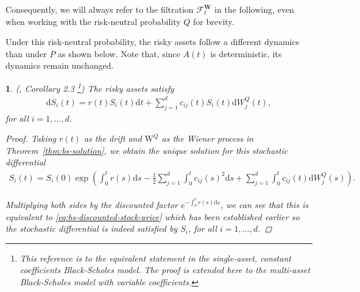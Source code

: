 \documentclass[english]{article}
\numberwithin{equation}{section}
\numberwithin{figure}{section}
\theoremstyle{bolddescit}
\newtheorem{theorem}{\protect\theoremname}[section]
\theoremstyle{definition}
\theoremstyle{definition}
\theoremstyle{plain}
\theoremstyle{plain}
\theoremstyle{bolddesc}
\theoremstyle{plain}
\theoremstyle{remark}
\providecommand{\theoremname}{Theorem}
\begin{document}
Consequently, we will always refer to the filtration $\mathcal{F}^\mathbf{W}_t$ in the following, even when working with the risk-neutral probability $Q$ for brevity.

Under this risk-neutral probability, the risky assets follow a different dynamics than under $P$ as shown below. Note that, since $A(t)$ is deterministic, its dynamics remain unchanged.

\begin{theorem}\label{thm:bs-risk-neutral-dynamics}
  (\cite{capinski_blackscholes_2012}, Corollary 2.3 \footnote{This reference is to the equivalent statement in the single-asset, constant coefficients Black-Scholes model. The proof is extended here to the multi-asset Black-Scholes model with variable coefficients.\label{foot:basic-bs-model}})
  The risky assets satisfy
  \begin{align*}
    \mathrm{d}S_i(t) = r(t) S_i(t) \mathrm{d}t + \sum_{j=1}^{d} c_{ij}(t) S_i(t) \mathrm{d}W^Q_j(t),
  \end{align*}
  for all $i=1,\ldots,d$.

  \begin{proof}
    Taking $r(t)$ as the drift and $\mathrm{W}^Q$ as the Wiener process in Theorem~\ref{thm:bs-solution}, we obtain the unique solution for this stochastic differential
    \begin{align}\label{eq:bs-risk-neutral-dynamics}
      S_i(t)
      = S_i(0) \exp  \left( \int_0^t r(s) \mathrm{d}s - \frac{1}{2} \sum_{j=1}^{d} \int_0^t c_{ij}(s)^2 \mathrm{d}s + \sum_{j=1}^d \int_0^t c_{ij}(t) \mathrm{d}W^Q_j(s)\right).
    \end{align}

    Multiplying both sides by the discounted factor $e^{-\int_0^t r(s) \mathrm{d}s}$, we can see that this is equivalent to \eqref{eq:bs-discounted-stock-price} which has been established earlier so the stochastic differential is indeed satisfied by $S_i$, for all $i=1,\ldots,d$.
  \end{proof}
\end{theorem}
\end{document}
